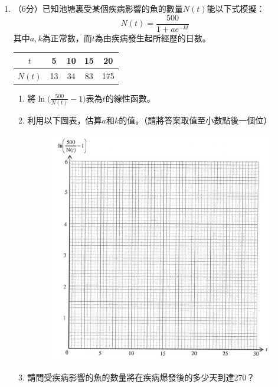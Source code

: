 \documentclass[12pt]{article}
\begin{document}
\begin{enumerate}
        \hrulefill
        \item （6分）已知池塘裏受某個疾病影響的魚的數量$N(t)$能以下式模擬：$$N(t)=\frac{500}{1+ae^{-kt}}$$其中$a,k$為正常數，而$t$為由疾病發生起所經歷的日數。
        \begin{center}
            \begin{tabular}{|c|c|c|c|c|}
                \hline
                $t$&5&10&15&20\\
                \hline
                $N(t)$&13&34&83&175\\
                \hline
            \end{tabular}
        \end{center}
        \begin{enumerate}
            \item 將$\displaystyle\ln\biggl(\frac{500}{N(t)}-1\biggr)$表為$t$的線性函數。
            \item 利用以下圖表，估算$a$和$k$的值。（請將答案取值至小數點後一個位）\begin{figure}[H]
                \centering
                \includegraphics[scale=0.75]{graph_paper.png}
            \end{figure}
            \item 請問受疾病影響的魚的數量將在疾病爆發後的多少天到達270？
        \end{enumerate}


\end{enumerate}
\end{document}

